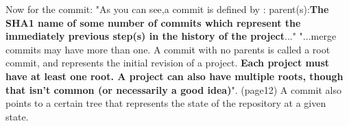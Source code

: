 Now for the commit:  
"As you can see,a commit is defined by : 
parent(s):{\bf The SHA1 name of some number of commits which
represent the immediately previous step(s) in the 
history of the project}..."
"...merge commits may have more than one. A commit with no 
parents is called a root commit, and represents the 
initial revision of a project. {\bf Each project must have at
least one root. A project can also have multiple roots,
though that isn't common (or necessarily a good idea)}". 
\cite{gitComm} (page12) 
A commit also points to a certain tree that represents the state of the
repository at a given state. \par




%
%
%
%
%
%
%
%
%
%

